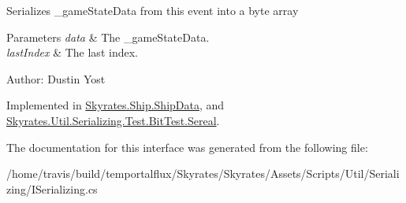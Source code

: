 Serializes \-\_\-game\-State\-Data from this event into a byte array 


\begin{DoxyParams}{Parameters}
{\em data} & The \-\_\-game\-State\-Data.\\
\hline
{\em last\-Index} & The last index.\\
\hline
\end{DoxyParams}


Author\-: Dustin Yost 

Implemented in \hyperlink{class_skyrates_1_1_ship_1_1_ship_data_aecbf0716f2aa099de5398ad12a284560}{Skyrates.\-Ship.\-Ship\-Data}, and \hyperlink{class_skyrates_1_1_util_1_1_serializing_1_1_test_1_1_bit_test_1_1_sereal_a76abc2eb08c20162674796b953808e5f}{Skyrates.\-Util.\-Serializing.\-Test.\-Bit\-Test.\-Sereal}.



The documentation for this interface was generated from the following file\-:\begin{DoxyCompactItemize}
\item 
/home/travis/build/temportalflux/\-Skyrates/\-Skyrates/\-Assets/\-Scripts/\-Util/\-Serializing/I\-Serializing.\-cs\end{DoxyCompactItemize}
